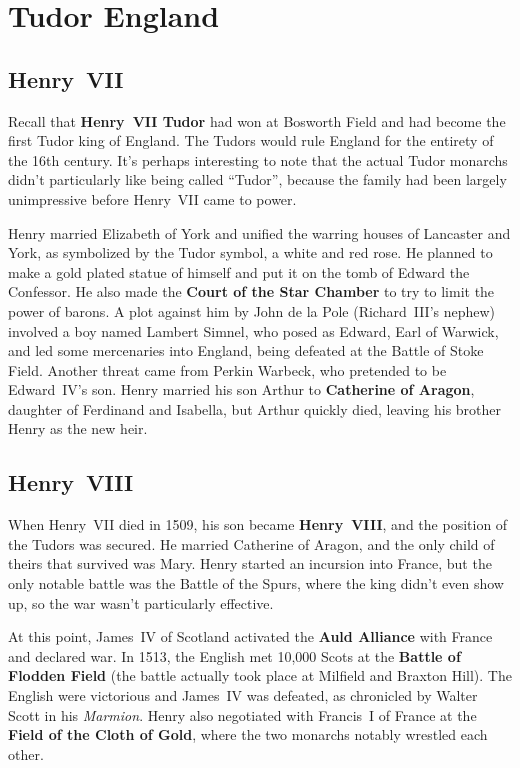 \section{Tudor England}

\subsection*{Henry~VII}

Recall that \textbf{Henry~VII Tudor} had won at Bosworth Field
and had become the first Tudor king of England.
The Tudors would rule England for the entirety of the 16th century.
It's perhaps interesting to note that the actual Tudor monarchs
didn't particularly like being called ``Tudor'',
because the family had been largely unimpressive before Henry~VII came to power.

Henry married Elizabeth of York and unified the warring houses of Lancaster and York,
as symbolized by the Tudor symbol, a white and red rose.
He planned to make a gold plated statue of himself and put it on the tomb of Edward the Confessor.
He also made the \textbf{Court of the Star Chamber} to try to limit the power of barons.
A plot against him by John de la Pole (Richard~III's nephew) involved a boy named Lambert Simnel,
who posed as Edward, Earl of Warwick,
and led some mercenaries into England, being defeated at the Battle of Stoke Field.
Another threat came from Perkin Warbeck, who pretended to be Edward~IV's son.
Henry married his son Arthur to \textbf{Catherine of Aragon}, daughter of Ferdinand and Isabella,
but Arthur quickly died, leaving his brother Henry as the new heir.

\subsection*{Henry~VIII}

When Henry~VII died in 1509, his son became \textbf{Henry~VIII},
and the position of the Tudors was secured.
He married Catherine of Aragon, and the only child of theirs that survived was Mary.
Henry started an incursion into France, but the only notable battle was the Battle of the Spurs,
where the king didn't even show up, so the war wasn't particularly effective.

At this point,
James~IV of Scotland activated the \textbf{Auld Alliance} with France and declared war.
In 1513, the English met 10,000 Scots at the \textbf{Battle of Flodden Field}
(the battle actually took place at Milfield and Braxton Hill).
The English were victorious and James~IV was defeated,
as chronicled by Walter Scott in his \textit{Marmion}.
Henry also negotiated with Francis~I of France at the \textbf{Field of the Cloth of Gold},
where the two monarchs notably wrestled each other.

